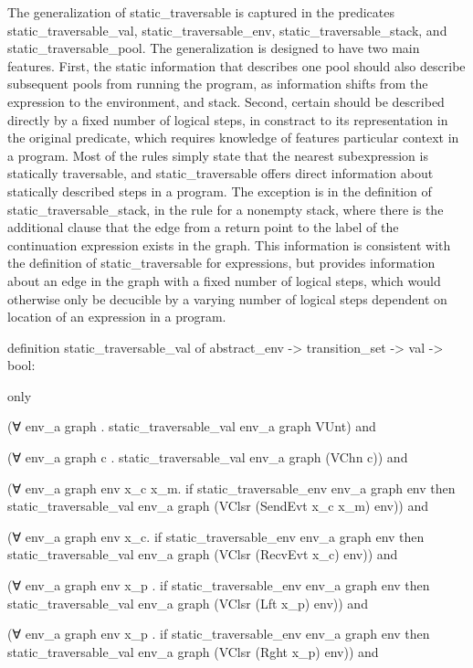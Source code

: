 \documentclass{article}
\begin{document}
The generalization of static_traversable is captured in the predicates static_traversable_val,
static_traversable_env, static_traversable_stack, and static_traversable_pool.  The
generalization is designed to have two main features.  First, the static information that
describes one pool should also describe subsequent pools from running the program, as
information shifts from the expression to the environment, and stack.  Second, certain should
be described directly by a fixed number of logical steps, in constract to its representation in
the original predicate, which requires knowledge of features particular context in a program.
Most of the rules simply state that the nearest subexpression is statically traversable, and
static_traversable offers direct information about statically described steps in a program.
The exception is in the definition of static_traversable_stack, in the rule for a nonempty
stack, where there is the additional clause that the edge from a return point to the label of
the continuation expression exists in the graph.  This information is consistent with the
definition of static_traversable for expressions, but provides information about an edge in the
graph with a fixed number of logical steps, which would otherwise only be decucible by a
varying number of logical steps dependent on location of an expression in a program.



definition static_traversable_val of abstract_env -> transition_set -> val -> bool:

only

(∀ env_a graph . static_traversable_val env_a graph VUnt) and 

(∀ env_a graph c . static_traversable_val env_a graph (VChn c)) and

(∀ env_a graph env x_c x_m.
  if
    static_traversable_env env_a graph env 
  then 
    static_traversable_val env_a graph (VClsr (SendEvt x_c x_m) env)) and

(∀ env_a graph env x_c.
  if
    static_traversable_env env_a graph env 
  then
    static_traversable_val env_a graph (VClsr (RecvEvt x_c) env)) and

(∀ env_a graph env x_p .
  if
    static_traversable_env env_a graph env 
  then
    static_traversable_val env_a graph (VClsr (Lft x_p) env)) and

(∀ env_a graph env x_p .
  if
    static_traversable_env env_a graph env
  then
    static_traversable_val env_a graph (VClsr (Rght x_p) env)) and
\end{document}
